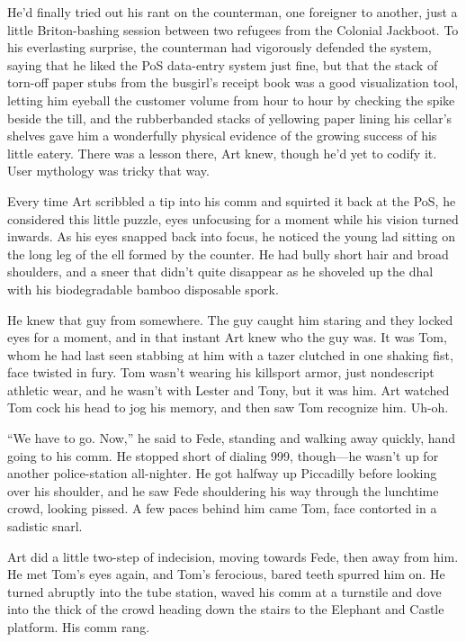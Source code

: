 He’d finally tried out his rant on the counterman, one foreigner to
another, just a little Briton-bashing session between two refugees
from the Colonial Jackboot. To his everlasting surprise, the
counterman had vigorously defended the system, saying that he liked
the PoS data-entry system just fine, but that the stack of torn-off
paper stubs from the busgirl’s receipt book was a good
visualization tool, letting him eyeball the customer volume from
hour to hour by checking the spike beside the till, and the
rubberbanded stacks of yellowing paper lining his cellar’s shelves
gave him a wonderfully physical evidence of the growing success of
his little eatery. There was a lesson there, Art knew, though he’d
yet to codify it. User mythology was tricky that way.

Every time Art scribbled a tip into his comm and squirted it back
at the PoS, he considered this little puzzle, eyes unfocusing for a
moment while his vision turned inwards. As his eyes snapped back
into focus, he noticed the young lad sitting on the long leg of the
ell formed by the counter. He had bully short hair and broad
shoulders, and a sneer that didn’t quite disappear as he shoveled
up the dhal with his biodegradable bamboo disposable spork.

He knew that guy from somewhere. The guy caught him staring and
they locked eyes for a moment, and in that instant Art knew who the
guy was. It was Tom, whom he had last seen stabbing at him with a
tazer clutched in one shaking fist, face twisted in fury. Tom
wasn’t wearing his killsport armor, just nondescript athletic wear,
and he wasn’t with Lester and Tony, but it was him. Art watched Tom
cock his head to jog his memory, and then saw Tom recognize him.
Uh-oh.

“We have to go. Now,” he said to Fede, standing and walking away
quickly, hand going to his comm. He stopped short of dialing 999,
though—he wasn’t up for another police-station all-nighter. He got
halfway up Piccadilly before looking over his shoulder, and he saw
Fede shouldering his way through the lunchtime crowd, looking
pissed. A few paces behind him came Tom, face contorted in a
sadistic snarl.

Art did a little two-step of indecision, moving towards Fede, then
away from him. He met Tom’s eyes again, and Tom’s ferocious, bared
teeth spurred him on. He turned abruptly into the tube station,
waved his comm at a turnstile and dove into the thick of the crowd
heading down the stairs to the Elephant and Castle platform. His
comm rang.

